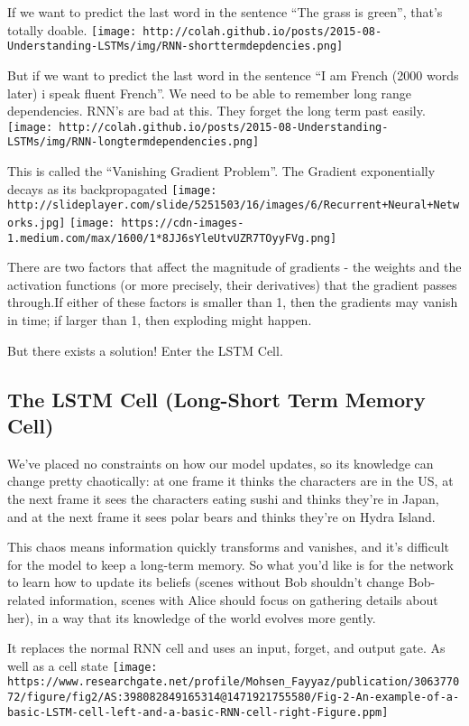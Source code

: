 \documentclass[11pt]{article}
\makeatletter
\def\maxwidth{\ifdim\Gin@nat@width>\linewidth\linewidth
    \else\Gin@nat@width\fi}
\let\Oldincludegraphics\includegraphics
\renewcommand{\includegraphics}[1]{\Oldincludegraphics[width=.8\maxwidth]{#1}}
\makeatother
\begin{document}
If we want to predict the last word in the sentence ``The grass is
green'', that's totally doable.
\texttt{[image: http://colah.github.io/posts/2015-08-Understanding-LSTMs/img/RNN-shorttermdepdencies.png]}

But if we want to predict the last word in the sentence ``I am French
(2000 words later) i speak fluent French''. We need to be able to
remember long range dependencies. RNN's are bad at this. They forget the
long term past easily.
\texttt{[image: http://colah.github.io/posts/2015-08-Understanding-LSTMs/img/RNN-longtermdependencies.png]}

This is called the ``Vanishing Gradient Problem''. The Gradient
exponentially decays as its backpropagated
\texttt{[image: http://slideplayer.com/slide/5251503/16/images/6/Recurrent+Neural+Networks.jpg]}
\texttt{[image: https://cdn-images-1.medium.com/max/1600/1*8JJ6sYleUtvUZR7TOyyFVg.png]}

There are two factors that affect the magnitude of gradients - the
weights and the activation functions (or more precisely, their
derivatives) that the gradient passes through.If either of these factors
is smaller than 1, then the gradients may vanish in time; if larger than
1, then exploding might happen.

But there exists a solution! Enter the LSTM Cell.

\hypertarget{the-lstm-cell-long-short-term-memory-cell}{%
\subsection{The LSTM Cell (Long-Short Term Memory
Cell)}\label{the-lstm-cell-long-short-term-memory-cell}}

We've placed no constraints on how our model updates, so its knowledge
can change pretty chaotically: at one frame it thinks the characters are
in the US, at the next frame it sees the characters eating sushi and
thinks they're in Japan, and at the next frame it sees polar bears and
thinks they're on Hydra Island.

This chaos means information quickly transforms and vanishes, and it's
difficult for the model to keep a long-term memory. So what you'd like
is for the network to learn how to update its beliefs (scenes without
Bob shouldn't change Bob-related information, scenes with Alice should
focus on gathering details about her), in a way that its knowledge of
the world evolves more gently.

It replaces the normal RNN cell and uses an input, forget, and output
gate. As well as a cell state
\texttt{[image: https://www.researchgate.net/profile/Mohsen\_Fayyaz/publication/306377072/figure/fig2/AS:398082849165314@1471921755580/Fig-2-An-example-of-a-basic-LSTM-cell-left-and-a-basic-RNN-cell-right-Figure.ppm]}
\end{document}

